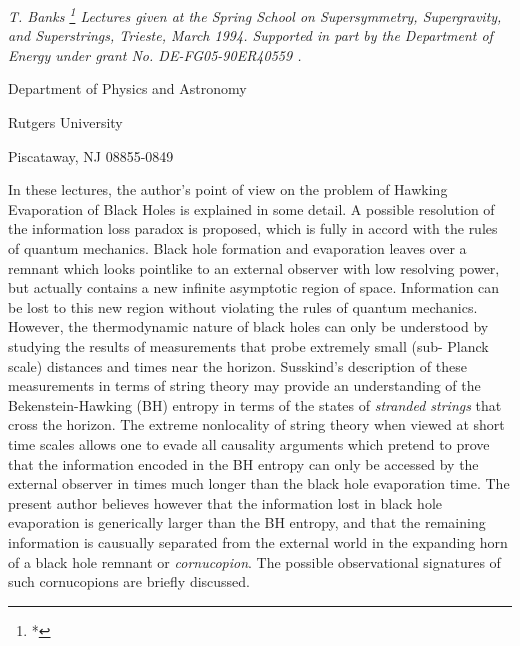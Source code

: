 \bigskip
\centerline{\it
T. Banks  \footnote{*}
{\rm  Lectures given at the Spring School on Supersymmetry, Supergravity,
 and Superstrings, Trieste, March 1994.
Supported in part by the Department of Energy under grant No.
DE-FG05-90ER40559  .} }
\smallskip
\centerline{Department of Physics and Astronomy}
\centerline{Rutgers University}
\centerline{Piscataway, NJ 08855-0849}
\noindent
\bigskip
\noindent
In these lectures, the author's point of view on the problem of Hawking
Evaporation of Black Holes is explained in some detail.  A possible resolution
of the information loss paradox is proposed, which is fully in accord with the
rules of quantum mechanics.  Black hole formation and evaporation leaves
over a remnant which looks pointlike to an external observer with low resolving
power, but actually contains a new infinite asymptotic region of space.
Information can be lost to this new region without violating the rules of
quantum mechanics.  However, the thermodynamic nature of black holes can
only be understood by studying the results of measurements that probe
extremely small (sub- Planck scale) distances and times near the horizon.
Susskind's description of these measurements in terms of string theory may
provide an understanding of the Bekenstein-Hawking (BH) entropy in terms of
the states of {\it stranded strings} that cross the horizon.  The extreme
nonlocality of string theory when viewed at short time scales allows one
to evade all causality arguments which pretend to prove that the information
encoded in the BH entropy can only be accessed by the external observer
in times much longer than the black hole evaporation time.  The present author
believes however that the information lost in black hole evaporation is
generically larger than the BH entropy, and that the remaining information
is causually separated from the external world in the expanding horn of
a black hole remnant or {\it cornucopion}.  The possible observational
signatures of such cornucopions are briefly discussed.



